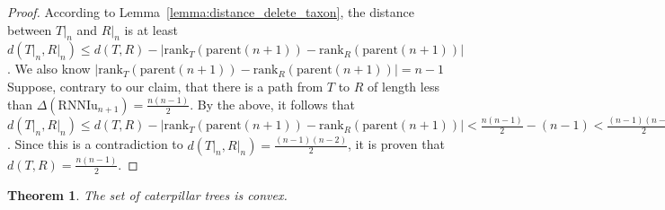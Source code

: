 \documentclass{amsart}
\newcommand{\parent}{\mathrm{parent}}
\newcommand{\rank}{\mathrm{rank}}
\newcommand{\rnniu}{\mathrm{RNNIu}}
\newtheorem{theorem}[definition]{Theorem}
\begin{document}
\begin{proof}
    According to Lemma~\ref{lemma:distance_delete_taxon}, the distance between $T{\big|}_n$ and $R{\big|}_n$ is at least $d(T{\big|}_n, R{\big|}_n) \leq d(T,R) - |\rank_T(\parent(n+1)) - \rank_R(\parent(n+1))|$.
    We also know $|\rank_T(\parent(n+1)) - \rank_R(\parent(n+1))| = n-1$
    Suppose, contrary to our claim, that there is a path from $T$ to $R$ of length less than $\Delta(\rnniu_{n+1}) = \frac{n(n-1)}{2}$.
    By the above, it follows that $d(T{\big|}_n, R{\big|}_n) \leq d(T,R) - |\rank_T(\parent(n+1)) - \rank_R(\parent(n+1))| < \frac{n(n-1)}{2} - (n-1) < \frac{(n-1)(n-2)}{2}$.
    Since this is a contradiction to $d(T{\big|}_n, R{\big|}_n) = \frac{(n-1)(n-2)}{2}$, it is proven that $d(T,R) = \frac{n(n-1)}{2} $.

\end{proof}

\begin{theorem}
    The set of caterpillar trees is convex.
    \label{thm:caterpillar_convex}
\end{theorem}
\end{document}
